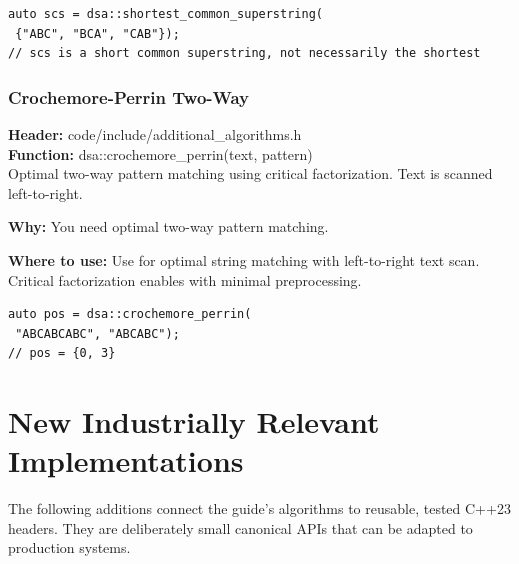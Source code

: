 \documentclass[11pt]{article}
\begin{document}
\begin{lstlisting}
auto scs = dsa::shortest_common_superstring(
 {"ABC", "BCA", "CAB"});
// scs is a short common superstring, not necessarily the shortest
\end{lstlisting}

\subsubsection{Crochemore-Perrin Two-Way}
\textbf{Header:} code/include/additional\_algorithms.h\\
\textbf{Function:} dsa::crochemore\_perrin(text, pattern)\\

Optimal two-way pattern matching using critical factorization. Text is scanned left-to-right.

\textbf{Why:} You need optimal two-way pattern matching. \par \textbf{Where to use:} Use for optimal string matching with left-to-right text scan. Critical factorization enables with minimal preprocessing.

\begin{lstlisting}
auto pos = dsa::crochemore_perrin(
 "ABCABCABC", "ABCABC");
// pos = {0, 3}
\end{lstlisting}


\section{New Industrially Relevant Implementations}

The following additions connect the guide's algorithms to reusable, tested C++23 headers. They are deliberately small canonical APIs that can be adapted to production systems.
\end{document}
